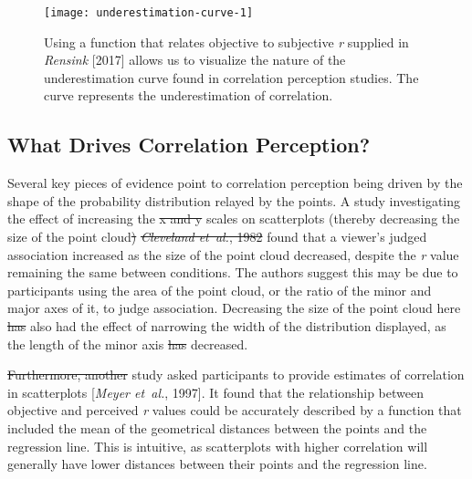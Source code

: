 \documentclass[preprint, 3p,
authoryear]{elsarticle} %
\newcommand{\ldiffentity}[1]{#1}
\providecommand{\DIFaddtex}[1]{{\protect\color{blue}\uwave{#1}}} %
\providecommand{\DIFdeltex}[1]{{\protect\color{red}\sout{#1}}}                      %
\providecommand{\DIFaddbegin}{} %
\providecommand{\DIFaddend}{} %
\providecommand{\DIFdelbegin}{} %
\providecommand{\DIFdelend}{} %
\providecommand{\DIFadd}[1]{\texorpdfstring{\DIFaddtex{#1}}{#1}} %
\providecommand{\DIFdel}[1]{\texorpdfstring{\DIFdeltex{#1}}{}} %
\newcommand{\DIFscaledelfig}{0.5}
\newlength{\DIFdelgraphicswidth} %
\newlength{\DIFdelgraphicsheight} %
\newcommand{\DIFaddincludegraphics}[2][]{{\color{blue}\fbox{\DIFOincludegraphics[#1]{#2}}}} %
\newcommand{\DIFdelincludegraphics}[2][]{%
\sbox{\DIFdelgraphicsbox}{\DIFOincludegraphics[#1]{#2}}%
\settoboxwidth{\DIFdelgraphicswidth}{\DIFdelgraphicsbox} %
\settoboxtotalheight{\DIFdelgraphicsheight}{\DIFdelgraphicsbox} %
\scalebox{\DIFscaledelfig}{%
\parbox[b]{\DIFdelgraphicswidth}{\usebox{\DIFdelgraphicsbox}\\[-\baselineskip] \rule{\DIFdelgraphicswidth}{0em}}\llap{\resizebox{\DIFdelgraphicswidth}{\DIFdelgraphicsheight}{%
\setlength{\unitlength}{\DIFdelgraphicswidth}%
\begin{picture}(1,1)%
\thicklines\linethickness{2pt} %
{\color[rgb]{1,0,0}\put(0,0){\framebox(1,1){}}}%
{\color[rgb]{1,0,0}\put(0,0){\line( 1,1){1}}}%
{\color[rgb]{1,0,0}\put(0,1){\line(1,-1){1}}}%
\end{picture}%
}\hspace*{3pt}}} %
} %
\DeclareRobustCommand{\DIFaddbegin}{\DIFOaddbegin \let\includegraphics\DIFaddincludegraphics} %
\DeclareRobustCommand{\DIFaddend}{\DIFOaddend \let\includegraphics\DIFOincludegraphics} %
\DeclareRobustCommand{\DIFdelbegin}{\DIFOdelbegin \let\includegraphics\DIFdelincludegraphics} %
\DeclareRobustCommand{\DIFdelend}{\DIFOaddend \let\includegraphics\DIFOincludegraphics} %
\begin{document}
\begin{figure}

\texttt{[image: underestimation-curve-1]} \hfill{}

\caption{\label{underestimation-curve}Using a function that relates objective to subjective \textit{r} supplied in \ldiffentity{\textit{Rensink} [\ldiffentity{2017}]} allows us to visualize the nature of the underestimation curve found in correlation perception studies. The curve represents the underestimation of correlation.}\label{fig:underestimation-curve}
\end{figure}

\hypertarget{what-drives-correlation-perception}{%
\subsection{What Drives Correlation
Perception?}\label{what-drives-correlation-perception}}

Several key pieces of evidence point to correlation perception being
driven by the shape of the probability distribution relayed by the
points. A study investigating the effect of increasing the \DIFdelbegin \DIFdel{x and
y
}\DIFdelend \DIFaddbegin \DIFadd{\(x\) and
\(y\) }\DIFaddend scales on scatterplots (thereby decreasing the size of the point
cloud\DIFdelbegin \DIFdel{)
}%
\DIFdel{\ldiffentity{\textit{Cleveland et~al.}, \ldiffentity{1982}}}%
\DIFdelend \DIFaddbegin \DIFadd{, \mbox{%
\citealp{cleveland_1982}}\hskip0pt%
) }\DIFaddend found that a viewer's judged
association increased as the size of the point cloud decreased, despite
the \emph{r} value remaining the same between conditions. The authors
suggest this may be due to participants using the area of the point
cloud, or the ratio of the minor and major axes of it, to judge
association. Decreasing the size of the point cloud here \DIFdelbegin \DIFdel{has }\DIFdelend also had the
effect of narrowing the width of the distribution displayed, as the
length of the minor axis \DIFdelbegin \DIFdel{has }\DIFdelend decreased.

\DIFdelbegin \DIFdel{Furthermore, another }\DIFdelend \DIFaddbegin \DIFadd{Another }\DIFaddend study asked participants to provide estimates of correlation in
scatterplots [\ldiffentity{\textit{Meyer et~al.}, \ldiffentity{1997}}]. It found that the relationship between
objective and perceived \emph{r} values could be accurately described by
a function that included the mean of the geometrical distances between
the points and the regression line. This is intuitive, as scatterplots
with higher correlation will generally have lower \DIFaddbegin \DIFadd{average }\DIFaddend distances
between their points and the regression line.
\end{document}
